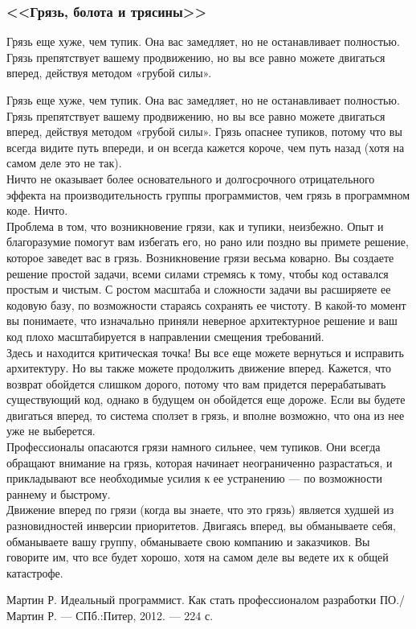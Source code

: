\documentclass{../industrial-development}
\begin{document}
\begin{frame} \frametitle{<<Грязь, болота и трясины>>}
\begin{block}{}
Грязь еще хуже, чем тупик. Она вас замедляет, но не останавливает полностью. Грязь препятствует вашему продвижению, но вы все равно можете двигаться вперед, действуя методом «грубой силы». 
\end{block}
\end{frame}
\lecturenotes
Грязь еще хуже, чем тупик. Она вас замедляет, но не останавливает полностью. Грязь препятствует вашему продвижению, но вы все равно можете двигаться вперед, действуя методом «грубой силы». Грязь опаснее тупиков, потому что вы всегда видите путь впереди, и он всегда кажется короче, чем путь назад (хотя на самом деле это не так).\\
Ничто не оказывает более основательного и долгосрочного отрицательного эффекта на
производительность группы программистов, чем грязь в программном коде. Ничто.\\
Проблема в том, что возникновение грязи, как и тупики, неизбежно. Опыт и благоразумие помогут вам избегать его, но рано или поздно вы примете решение, которое заведет вас в грязь. Возникновение грязи весьма коварно. Вы создаете решение простой задачи, всеми силами стремясь к тому, чтобы код оставался простым и чистым. С ростом масштаба и сложности задачи вы расширяете ее кодовую базу, по возможности стараясь сохранять ее чистоту. В какой-то момент вы понимаете, что изначально приняли неверное архитектурное решение и ваш код плохо масштабируется в направлении смещения требований.\\
Здесь и находится критическая точка! Вы все еще можете вернуться и исправить архитектуру. Но вы также можете продолжить движение вперед. Кажется, что возврат обойдется слишком дорого, потому что вам придется перерабатывать существующий код, однако в будущем он обойдется еще дороже. Если вы будете двигаться вперед, то система сползет в грязь, и вполне возможно, что она из нее уже не выберется.\\
Профессионалы опасаются грязи намного сильнее, чем тупиков. Они всегда обращают внимание на грязь, которая начинает неограниченно разрастаться, и прикладывают все необходимые усилия к ее устранению — по возможности раннему и быстрому.\\
Движение вперед по грязи (когда вы знаете, что это грязь) является худшей из разновидностей инверсии приоритетов. Двигаясь вперед, вы обманываете себя, обманываете вашу группу, обманываете свою компанию и заказчиков. Вы говорите им, что все будет хорошо, хотя на самом деле вы ведете их к общей катастрофе.

\begin{thebibliography}{99}
 {Мартин Р. Идеальный программист. Как стать профессионалом разработки ПО./Мартин Р. — СПб.:Питер, 2012. — 224 с.}
\end{thebibliography}
\end{document}
